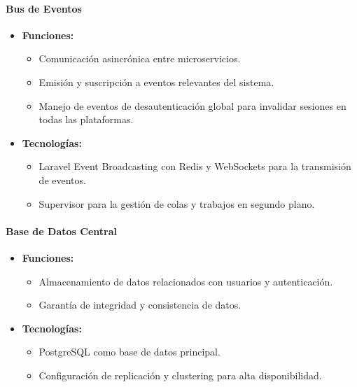 \paragraph{Bus de Eventos}
\begin{itemize}
    \item \textbf{Funciones:}
          \begin{itemize}
              \item Comunicación asincrónica entre microservicios.
              \item Emisión y suscripción a eventos relevantes del sistema.
              \item Manejo de eventos de desautenticación global para invalidar sesiones en todas las plataformas.
          \end{itemize}
    \item \textbf{Tecnologías:}
          \begin{itemize}
              \item Laravel Event Broadcasting con Redis y WebSockets para la transmisión de eventos.
              \item Supervisor para la gestión de colas y trabajos en segundo plano.
          \end{itemize}
\end{itemize}

\paragraph{Base de Datos Central}
\begin{itemize}
    \item \textbf{Funciones:}
          \begin{itemize}
              \item Almacenamiento de datos relacionados con usuarios y autenticación.
              \item Garantía de integridad y consistencia de datos.
          \end{itemize}
    \item \textbf{Tecnologías:}
          \begin{itemize}
              \item PostgreSQL como base de datos principal.
              \item Configuración de replicación y clustering para alta disponibilidad.
          \end{itemize}
\end{itemize}

